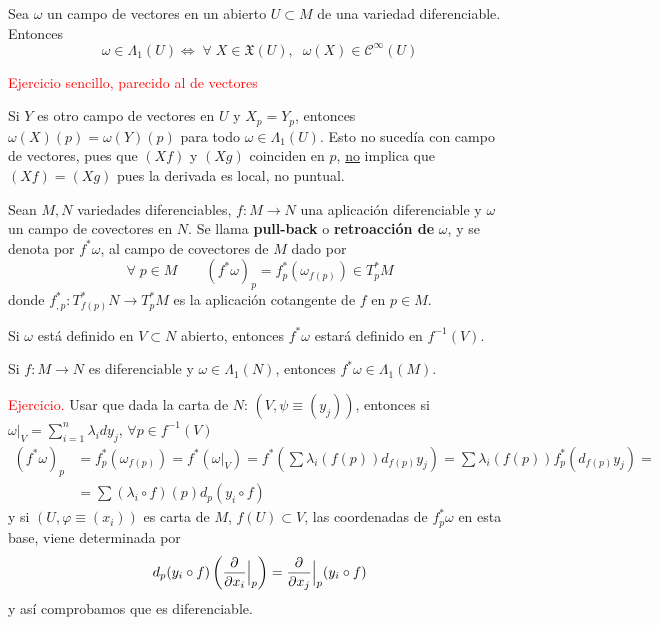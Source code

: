 \begin{prop}
Sea $\omega$ un campo de vectores en un abierto $U \subset M$ de una variedad diferenciable. Entonces 
$$\omega \in \Lambda_1(U) \iff \;\forall\; X \in \mathfrak{X}(U),\;\; \omega(X) \in \mathcal{C}^{\infty}(U)$$
\end{prop}
\begin{dem}
\textcolor{red}{Ejercicio sencillo, parecido al de vectores}
\end{dem}
\begin{obs}
Si $Y$ es otro campo de vectores en $U$ y $X_p = Y_p$, entonces $\omega(X)(p) = \omega(Y)(p)$ para todo $\omega \in \Lambda_1(U)$. Esto no suced\'ia con campo de vectores, pues que $(Xf)$ y $(Xg)$ coinciden en $p$, \underline{no} implica que $(Xf)=(Xg)$ pues la derivada es local, no puntual.
\end{obs}

\begin{defi}
Sean $M,N$ variedades diferenciables, $f:M\to N$ una aplicación diferenciable y $\omega$ un campo de covectores en $N$. Se llama \textbf{pull-back} o \textbf{retroacción de} $\omega$, y se denota por $f^*\omega$, al campo de covectores de $M$ dado por 
$$\forall\; p \in M \qquad (f^*\omega)_p = f^*_p(\omega_{f(p)}) \in T_p^*M$$
donde $f_{,p}^*: T_{f(p)}^*N \longrightarrow T_p^*M$ es la aplicaci\'on cotangente de $f$ en $p\in M$.
\end{defi}
\begin{obs}
    Si $\omega$ est\'a definido en $V \subset N$ abierto, entonces $f^*\omega$ estar\'a definido en $f^{-1}(V)$.
\end{obs}
\begin{prop}
Si $f:M\to N$ es diferenciable y $\omega\in \Lambda_1(N)$, entonces $f^*\omega \in \Lambda_1(M)$.
\end{prop}
\begin{dem}
\textcolor{red}{Ejercicio.} Usar que dada la carta de $N$: $(V,\psi\equiv(y_j))$, entonces si $\displaystyle \omega|_V=\sum_{i=1}^n \lambda_i dy_j$, $\forall p \in f^{-1}(V)$
\[ \begin{split}(f^*\omega)_p & =f_p^*(\omega_{f(p)})=f^*(\omega|_V)= f^*(\sum \lambda_i(f(p)) d_{f(p)}y_j) = \sum \lambda_i(f(p)) f^*_p (d_{f(p)}y_j) = \\ & =\sum(\lambda_i \circ f)(p) d_p(y_i \circ f) \end{split} \]
y si $(U,\varphi\equiv(x_i))$ es carta de $M$, $f(U)\subset V$, las coordenadas de $f^*_p\omega$ en esta base, viene determinada por 
$$d_p(y_i\circ f) \left( \dfrac{\partial^{} }{\partial x_i}\Big|_p \right)= \dfrac{\partial^{} }{\partial x_j}\Big|_p(y_i\circ f)$$
y as\'i comprobamos que es diferenciable.
\end{dem}

